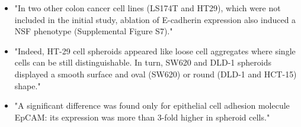 \documentclass[11pt,a4paper]{article}
\begin{document}
\begin{itemize}
\item "In two other colon cancer cell lines (LS174T and HT29), which were not included in the initial study, ablation of E-cadherin expression also induced a NSF phenotype (Supplemental Figure S7)."\cite{Stadler2018}

\item "Indeed, HT-29 cell spheroids appeared like loose cell aggregates where single cells can be still distinguishable. In turn, SW620 and DLD-1 spheroids displayed a smooth surface and oval (SW620) or round (DLD-1 and HCT-15) shape."\cite{Sargenti2020}

\item "A significant difference was found only for epithelial cell adhesion molecule EpCAM: its expression was more than 3-fold higher in spheroid cells."\cite{Gisina2020}


\end{itemize}
\end{document}
